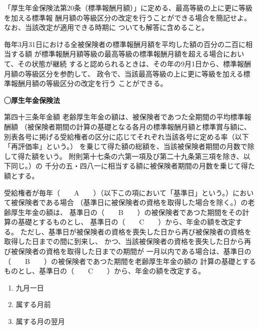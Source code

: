 \begin{shortanswer}[数理人試験 2025 問題3 設問3]
  「厚生年金保険法第20条（標準報酬月額）」に定める、最高等級の上に更に等級を加える標準報
酬月額の等級区分の改定を行うことができる場合を簡記せよ。なお、当該改定が適用できる時期に
ついても解答に含めること。
\end{shortanswer}

\begin{answerbox}
  毎年3月31日における全被保険者の標準報酬月額を平均した額の百分の二百に相当する額
が標準報酬月額等級の最高等級の標準報酬月額を超える場合において、その状態が継続
すると認められるときは、その年の9月1日から、標準報酬月額の等級区分を参酌して、
政令で、当該最高等級の上に更に等級を加える標準報酬月額の等級区分の改定を行う
ことができる。
\end{answerbox}

\begin{fillblank}[年金1 2023 問題1(5)ア]
    \noindent \textbf{◯厚生年金保険法}
  \begin{lawstructure}
    \begin{lawarticle}{第四十三条}{年金額}
      老齢厚生年金の額は、被保険者であつた全期間の平均標準報酬額
      （被保険者期間の計算の基礎となる各月の標準報酬月額と標準賞与額に、
      別表各号に掲げる受給権者の区分に応じてそれぞれ当該各号に定める率（以下「再評価率」という。）
      を乗じて得た額の総額を、当該被保険者期間の月数で除して得た額をいう。
      附則第十七条の六第一項及び第二十九条第三項を除き、以下同じ。）の
      千分の五・四八一に相当する額に被保険者期間の月数を乗じて得た額とする。

      受給権者が毎年（　　A　　）（以下この項において「基準日」という。）において被保険者である場合
      （基準日に被保険者の資格を取得した場合を除く。）の老齢厚生年金の額は、
      基準日の（　　B　　）の被保険者であつた期間をその計算の基礎とするものとし、
      基準日の（　　C　　）から、年金の額を改定する。
      ただし、基準日が被保険者の資格を喪失した日から再び被保険者の資格を取得した日までの間に到来し、
      かつ、当該被保険者の資格を喪失した日から再び被保険者の資格を取得した日までの期間が
      一月以内である場合は、基準日の（　　B　　）の被保険者であつた期間を老齢厚生年金の額の
      計算の基礎とするものとし、基準日の（　　C　　）から、年金の額を改定する。
    \end{lawarticle}
  \end{lawstructure}
\end{fillblank}

\begin{answerbox}
  \begin{enumerate}[A: ]
    \item 九月一日
    \item 属する月前
    \item 属する月の翌月
  \end{enumerate}
\end{answerbox}

